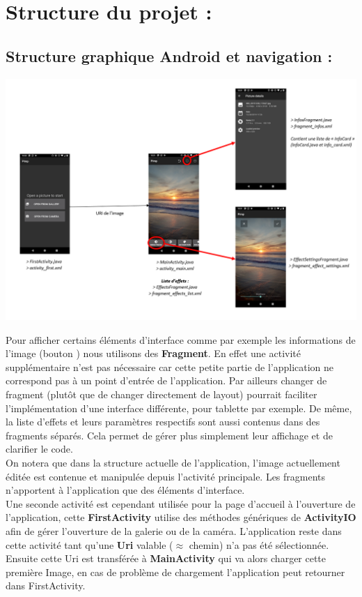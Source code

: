 \section{Structure du projet :}

\subsection{Structure graphique Android et navigation :}\label{navig}
\includegraphics[width=1\textwidth]{report_src/app_flowchart_fragments.PNG}

Pour afficher certains éléments d'interface comme par exemple les informations de l'image (bouton \faInfoCircle) nous utilisons des \textbf{Fragment}. En effet une activité supplémentaire n'est pas nécessaire car cette petite partie de l'application ne correspond pas à un point d'entrée de l'application. Par ailleurs changer de fragment (plutôt que de changer directement de layout) pourrait faciliter l'implémentation d'une interface différente, pour tablette par exemple.
De même, la liste d'effets et leurs paramètres respectifs sont aussi contenus dans des fragments séparés. Cela permet de gérer plus simplement leur affichage et de clarifier le code.
\\

On notera que dans la structure actuelle de l'application, l'image actuellement éditée est contenue et manipulée depuis l'activité principale. Les fragments n'apportent à l'application que des éléments d'interface.
\\

Une seconde activité est cependant utilisée pour la page d'accueil à l'ouverture de l'application, cette \textbf{FirstActivity} utilise des méthodes génériques de \textbf{ActivityIO} afin de gérer l'ouverture de la galerie ou de la caméra. L'application reste dans cette activité tant qu'une \textbf{Uri} valable ($\approx$ chemin) n'a pas été sélectionnée. Ensuite cette Uri est transférée à \textbf{MainActivity} qui va alors charger cette première Image, en cas de problème de chargement l'application peut retourner dans FirstActivity.

